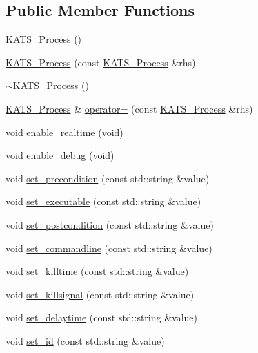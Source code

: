\subsection*{Public Member Functions}
\begin{DoxyCompactItemize}
\item 
\hyperlink{classKATS__Process_ae60140d056f6912da09a0178ecaa7d44}{KATS\_\-Process} ()
\item 
\hyperlink{classKATS__Process_a4fbee788f8e511200f0f307472a20f80}{KATS\_\-Process} (const \hyperlink{classKATS__Process}{KATS\_\-Process} \&rhs)
\item 
\hyperlink{classKATS__Process_a7657418f0f58b871e532745d92aa7c4d}{$\sim$KATS\_\-Process} ()
\item 
\hyperlink{classKATS__Process}{KATS\_\-Process} \& \hyperlink{classKATS__Process_ac662a14156c8a6eb1fabf032e9ce43ee}{operator=} (const \hyperlink{classKATS__Process}{KATS\_\-Process} \&rhs)
\item 
void \hyperlink{classKATS__Process_a5001291bcb531009b9089848734cc47f}{enable\_\-realtime} (void)
\item 
void \hyperlink{classKATS__Process_a9b9e4f9c68e1573326d26769e35f1236}{enable\_\-debug} (void)
\item 
void \hyperlink{classKATS__Process_ab551c7a477ee13d1de4849bd37a71924}{set\_\-precondition} (const std::string \&value)
\item 
void \hyperlink{classKATS__Process_a93de177ea804a8fcd3683ef08b9a04d4}{set\_\-executable} (const std::string \&value)
\item 
void \hyperlink{classKATS__Process_adbbf134f5c023829063ab3bad77ebc42}{set\_\-postcondition} (const std::string \&value)
\item 
void \hyperlink{classKATS__Process_a8eeed6e1890f3d09577fee47dddb06ad}{set\_\-commandline} (const std::string \&value)
\item 
void \hyperlink{classKATS__Process_a87a4ebc72cf062729c8bd2d420812432}{set\_\-killtime} (const std::string \&value)
\item 
void \hyperlink{classKATS__Process_a9e53408f83f89eeb71365210dfd08ec6}{set\_\-killsignal} (const std::string \&value)
\item 
void \hyperlink{classKATS__Process_a6fb83c9cbe59d9845690fee96775b1c4}{set\_\-delaytime} (const std::string \&value)
\item 
void \hyperlink{classKATS__Process_a066c72c7bf270adf29c3a0a0509cd687}{set\_\-id} (const std::string \&value)
\item 

\end{DoxyCompactItemize}
